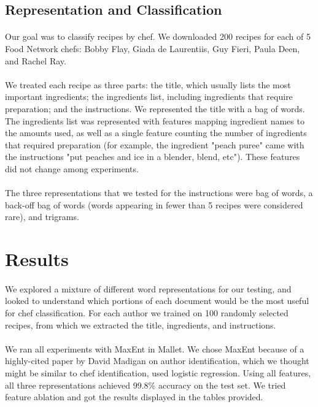 \documentclass[paper=a4, fontsize=11pt]{scrartcl} %
\begin{document}
\subsection{Representation and Classification}

\paragraph{}
Our goal was to classify recipes by chef.  
We downloaded 200 recipes for each of 5 Food Network chefs: Bobby Flay, Giada de Laurentiis, Guy Fieri, Paula Deen, and Rachel Ray.  

\paragraph{}
We treated each recipe as three parts: the title, which usually lists the most important ingredients; the ingredients list, including ingredients that require preparation; and the instructions.  We represented the title with a bag of words.  The ingredients list was represented with features mapping ingredient names to the amounts used, as well as a single feature counting the number of ingredients that required preparation (for example, the ingredient "peach puree" came with the instructions "put peaches and ice in a blender, blend, etc").  These features did not change among experiments.

\paragraph{}
The three representations that we tested for the instructions were bag of words, a back-off bag of words (words appearing in fewer than 5 recipes were considered rare), and trigrams.  

\section{Results}

\paragraph{}
We explored a mixture of different word representations for our testing, and looked to understand which portions of each document would be the most useful for chef classification.  For each author we trained on 100 randomly selected recipes, from which we extracted the title, ingredients, and instructions.

\paragraph{}
We ran all experiments with MaxEnt in Mallet.  
We chose MaxEnt because of a highly-cited paper by David Madigan on author identification, which we thought might be similar to chef identification, used logistic regression.  
Using all features, all three representations achieved 99.8\% accuracy on the test set.
We tried feature ablation and got the results displayed in the tables provided.
\end{document}

